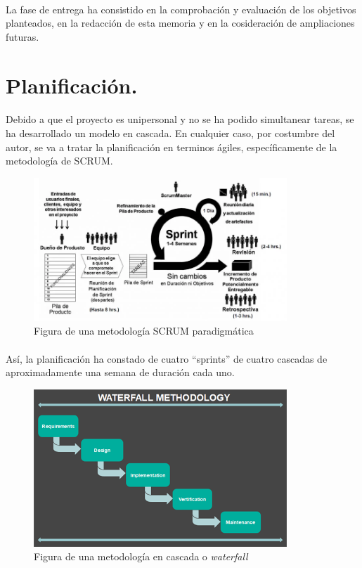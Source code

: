 \paragraph{}La fase de entrega ha consistido en la comprobación y evaluación de los
objetivos planteados, en la redacción de esta memoria y en la cosideración de ampliaciones
futuras.

\section{Planificación.}\label{sec:planificacion}

\paragraph{}Debido a que el proyecto es unipersonal y no se ha podido simultanear tareas,
se ha desarrollado un modelo en cascada. En cualquier caso, por costumbre del autor,
se va a tratar la planificación en terminos ágiles,
específicamente de la metodología de SCRUM.

\begin{figure}[H]
    \centering
    \includegraphics[width=0.85\textwidth]{imgs/scrum}
    \caption{Figura de una metodología SCRUM paradigmática}
    \label{fig:scrum}
\end{figure}

\paragraph{}Así, la planificación ha constado de cuatro ``sprints'' de cuatro cascadas
de aproximadamente una semana de duración cada uno.

\begin{figure}[H]
    \centering
    \includegraphics[width=0.85\textwidth]{imgs/waterfall}
    \caption{Figura de una metodología en cascada o \emph{waterfall}}
    \label{fig:waterfall}
\end{figure}

